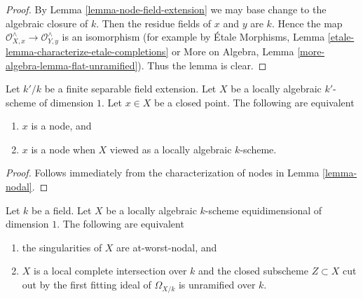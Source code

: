 \begin{proof}
By Lemma \ref{lemma-node-field-extension}
we may base change to the algebraic closure of $k$.
Then the residue fields of $x$ and $y$ are $k$.
Hence the map $\mathcal{O}_{X, x}^\wedge \to \mathcal{O}_{Y, y}^\wedge$
is an isomorphism (for example by
\'Etale Morphisms, Lemma \ref{etale-lemma-characterize-etale-completions} or
More on Algebra, Lemma \ref{more-algebra-lemma-flat-unramified}).
Thus the lemma is clear.
\end{proof}

\begin{lemma}
\label{lemma-node-over-separable-extension}
Let $k'/k$ be a finite separable field extension.
Let $X$ be a locally algebraic $k'$-scheme of dimension $1$.
Let $x \in X$ be a closed point. The following are equivalent
\begin{enumerate}
\item $x$ is a node, and
\item $x$ is a node when $X$ viewed as a locally algebraic $k$-scheme.
\end{enumerate}
\end{lemma}

\begin{proof}
Follows immediately from the characterization of nodes in
Lemma \ref{lemma-nodal}.
\end{proof}

\begin{lemma}
\label{lemma-nodal-lci}
Let $k$ be a field. Let $X$ be a locally algebraic $k$-scheme
equidimensional of dimension $1$.
The following are equivalent
\begin{enumerate}
\item the singularities of $X$ are at-worst-nodal, and
\item $X$ is a local complete intersection over $k$
and the closed subscheme $Z \subset X$ cut out by the
first fitting ideal of $\Omega_{X/k}$ is unramified over $k$.
\end{enumerate}
\end{lemma}


